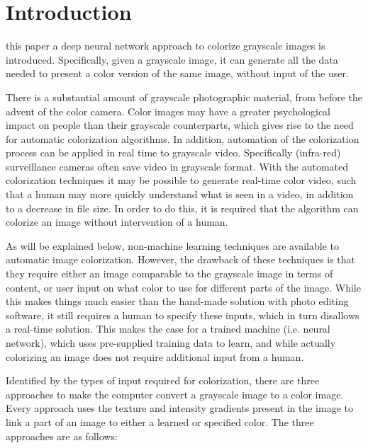 \section{Introduction}\label{sec:into}

%
%
%


 this paper a deep neural network approach to colorize grayscale images is introduced. Specifically, given a grayscale image, it can generate all the data needed to present a color version of the same image, without input of the user. 

There is a substantial amount of grayscale photographic material, from before the advent of the color camera. Color images may have a greater psychological impact on people than their grayscale counterparts, which gives rise to the need for automatic colorization algorithms. 
In addition, automation of the colorization process can be applied in real time to grayscale video. Specifically (infra-red) surveillance cameras often save video in grayscale format. With the automated colorization techniques it may be possible to generate real-time color video, such that a human may more quickly understand what is seen in a video, in addition to a decrease in file size. In order to do this, it is required that the algorithm can colorize an image without intervention of a human.

As will be explained below, non-machine learning techniques are available to automatic image colorization. However, the drawback of these techniques is that they require either an image comparable to the grayscale image in terms of content, or user input on what color to use for different parts of the image. While this makes things much easier than the hand-made solution with photo editing software, it still requires a human to specify these inputs, which in turn disallows a real-time solution. This makes the case for a trained machine (i.e. neural network), which uses pre-supplied training data to learn, and while actually colorizing an image does not require additional input from a human.

Identified by the types of input required for colorization, there are three approaches to make the computer convert a grayscale image to a color image. Every approach uses the texture and intensity gradients present in the image to link a part of an image to either a learned or specified color. The three approaches are as follows:

